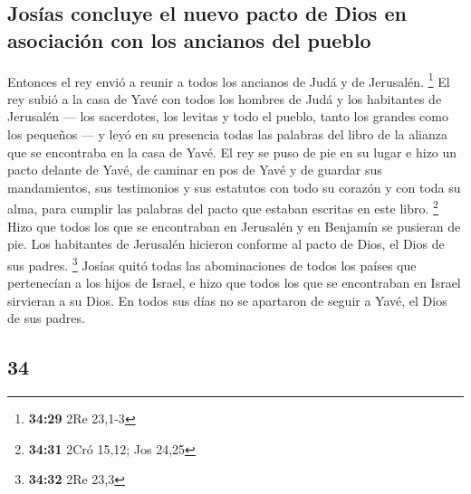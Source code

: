 \begin{paracol}{2}
\hypertarget{josuxedas-concluye-el-nuevo-pacto-de-dios-en-asociaciuxf3n-con-los-ancianos-del-pueblo}{%
\subsection{Josías concluye el nuevo pacto de Dios en asociación con los
ancianos del
pueblo}\label{josuxedas-concluye-el-nuevo-pacto-de-dios-en-asociaciuxf3n-con-los-ancianos-del-pueblo}}

 Entonces el rey envió a reunir a todos los ancianos de
Judá y de Jerusalén. \footnote{\textbf{34:29} 2Re 23,1-3}
 El rey subió a la casa de Yavé con todos los hombres de
Judá y los habitantes de Jerusalén --- los sacerdotes, los levitas y
todo el pueblo, tanto los grandes como los pequeños --- y leyó en su
presencia todas las palabras del libro de la alianza que se encontraba
en la casa de Yavé.  El rey se puso de pie en su lugar e
hizo un pacto delante de Yavé, de caminar en pos de Yavé y de guardar
sus mandamientos, sus testimonios y sus estatutos con todo su corazón y
con toda su alma, para cumplir las palabras del pacto que estaban
escritas en este libro. \footnote{\textbf{34:31} 2Cró 15,12; Jos 24,25}
 Hizo que todos los que se encontraban en Jerusalén y en
Benjamín se pusieran de pie. Los habitantes de Jerusalén hicieron
conforme al pacto de Dios, el Dios de sus padres. \footnote{\textbf{34:32}
  2Re 23,3}  Josías quitó todas las abominaciones de
todos los países que pertenecían a los hijos de Israel, e hizo que todos
los que se encontraban en Israel sirvieran a su Dios. En todos sus días
no se apartaron de seguir a Yavé, el Dios de sus padres.

\switchcolumn
\begin{otherlanguage}{english}

\hypertarget{section-67}{%
\section{34}\label{section-67}}


\end{otherlanguage}
\end{paracol}
